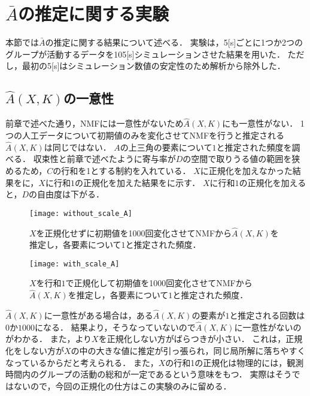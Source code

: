 \section{$\bar{A}$の推定に関する実験}
本節では$\bar{A}$の推定に関する結果について述べる．
実験は，5[s]ごとに1つか2つのグループが活動するデータを105[s]シミュレーションさせた結果を用いた．
ただし，最初の5[s]はシミュレーション数値の安定性のため解析から除外した．

\subsection{$\hat{A}(X,K)$の一意性}
前章で述べた通り，NMFには一意性がないため$\hat{A}(X,K)$にも一意性がない．
1つの人工データについて初期値のみを変化させてNMFを行うと推定される$\hat{A}(X,K)$は同じではない．
$A$の上三角の要素について$1$と推定された頻度を調べる．
収束性と前章で述べたように寄与率が$D$の空間で取りうる値の範囲を狭めるため，$C$の行和を1とする制約を入れている．
$X$に正規化を加えなかった結果をに，$X$に行和$1$の正規化を加えた結果をに示す．
$X$に行和$1$の正規化を加えると，$D$の自由度は下がる．

\begin{figure}[htbp]
    \begin{minipage}{0.5\hsize}
			\begin{center}
					\texttt{[image: without\_scale\_A]}
					\caption{$X$を正規化せずに初期値を1000回変化させてNMFから$\hat{A}(X,K)$を推定し，各要素について$1$と推定された頻度．}
					\label{fig:without_scale_A}
			\end{center}
		\end{minipage}
    \begin{minipage}{0.5\hsize}
			\begin{center}
					\texttt{[image: with\_scale\_A]}
					\caption{$X$を行和$1$で正規化して初期値を1000回変化させてNMFから$\hat{A}(X,K)$を推定し，各要素について$1$と推定された頻度．}
					\label{fig:with_scale_A}
			\end{center}
		\end{minipage}
\end{figure}

$\hat{A}(X,K)$に一意性がある場合は，ある$\hat{A}(X,K)$の要素が$1$と推定される回数は$0$か$1000$になる．
結果より，そうなっていないので$\hat{A}(X,K)$に一意性がないのがわかる．
また，より$X$を正規化しない方がばらつきが小さい．
これは，正規化をしない方が$X$の中の大きな値に推定が引っ張られ，同じ局所解に落ちやすくなっているからだと考えられる．
また，$X$の行和1の正規化は物理的には，観測時間内のグループの活動の総和が一定であるという意味をもつ．
実際はそうではないので，今回の正規化の仕方はこの実験のみに留める．

